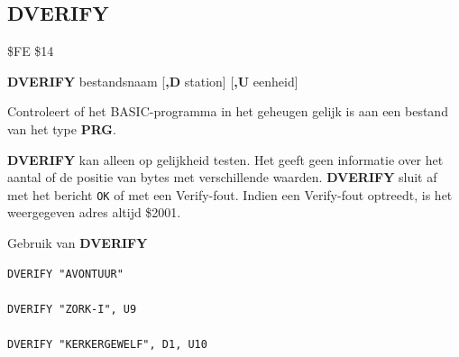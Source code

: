 \subsection{DVERIFY}
\begin{description}[leftmargin=2cm,style=nextline]
\item [Token:]    \$FE \$14

\item [Formaat:]   {\bf DVERIFY} bestandsnaam [{\bf,D} station] [{\bf,U} eenheid]

\item [Gebruik:]    Controleert of het BASIC-programma in het geheugen gelijk is aan een bestand van het type {\bf PRG}.

                  \filenamedefinition

                  \drivedefinition

                  \unitdefinition

\item [Opmerkingen:]  {\bf DVERIFY} kan alleen op gelijkheid testen. Het geeft geen informatie over het aantal of de positie van bytes met verschillende waarden. {\bf DVERIFY} sluit af met het bericht \texttt{OK} of met een Verify-fout. Indien een Verify-fout optreedt, is het weergegeven adres altijd \$2001.

\item [Voorbeelden:] Gebruik van {\bf DVERIFY}

\begin{tcolorbox}[colback=black,coltext=white]
\verbatimfont{\codefont}
\begin{verbatim}
DVERIFY "AVONTUUR"

DVERIFY "ZORK-I", U9

DVERIFY "KERKERGEWELF", D1, U10
\end{verbatim}
\end{tcolorbox}
\end{description}


\newpage
